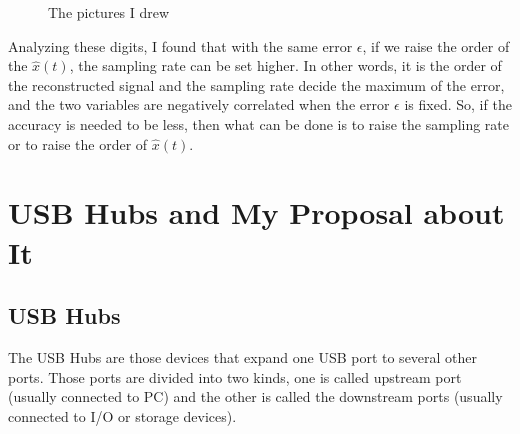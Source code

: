 \documentclass{article}
\begin{document}
\begin{figure}[!h]
	\centering
	\hspace{0 pt}
	\caption{The pictures I drew}
	\label{fig:maxes}
\end{figure}

Analyzing these digits, I found that with the same error $\epsilon$, if we raise the order of the $\hat{x}(t)$, the sampling rate can be set higher. In other words, it is the order of the reconstructed signal and the sampling rate decide the maximum of the error, and the two variables are negatively correlated when the error $\epsilon$ is fixed. So, if the accuracy is needed to be less, then what can be done is to raise the sampling rate or to raise the order of $\hat{x}(t)$.

\section{USB Hubs and My Proposal about It}
\subsection{USB Hubs}
The USB Hubs are those devices that expand one USB port to several other ports. Those ports are divided into two kinds, one is called upstream port (usually connected to PC) and the other is called the downstream ports (usually connected to I/O or storage devices).
\end{document}
